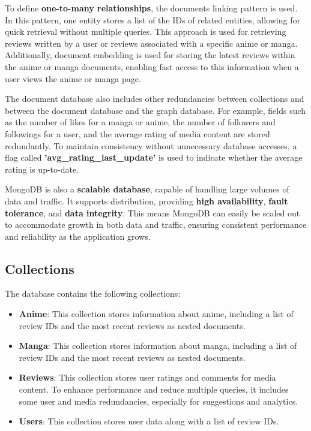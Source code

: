 \vspace{\baselineskip}

To define \textbf{one-to-many relationships}, the documents linking pattern is used. 
In this pattern, one entity stores a list of the IDs of related entities, allowing for 
quick retrieval without multiple queries. This approach is used for retrieving reviews 
written by a user or reviews associated with a specific anime or manga. Additionally, document 
embedding is used for storing the latest reviews within the anime or manga documents, enabling 
fast access to this information when a user views the anime or manga page.

\vspace{\baselineskip}

The document database also includes other redundancies between collections and between the document
database and the graph database. For example, fields such as the number of likes for a manga or 
anime, the number of followers and followings for a user, and the average rating of media content
are stored redundantly. To maintain consistency without unnecessary database accesses, a flag 
called \textbf{'avg\_rating\_last\_update'} is used to indicate whether the average rating is 
up-to-date.

\vspace{\baselineskip}

MongoDB is also a \textbf{scalable database}, capable of handling large volumes of data and traffic. 
It supports distribution, providing \textbf{high availability}, \textbf{fault tolerance}, and \textbf{data integrity}. 
This means MongoDB can easily be scaled out to accommodate growth in both data and traffic, ensuring consistent 
performance and reliability as the application grows.


\vspace{\baselineskip}

\subsection*{Collections}
The database contains the following collections:
\begin{itemize}
    \item \textbf{Anime}: 
    This collection stores information about anime, including a list of review IDs and the most recent reviews as nested documents.
    
    \item \textbf{Manga}: 
    This collection stores information about manga, including a list of review IDs and the most recent reviews as nested documents.
    
    \item \textbf{Reviews}: 
    This collection stores user ratings and comments for media content. To enhance performance and reduce multiple queries, it 
    includes some user and media redundancies, especially for suggestions and analytics.
    
    \item \textbf{Users}: 
    This collection stores user data along with a list of review IDs.
\end{itemize}

